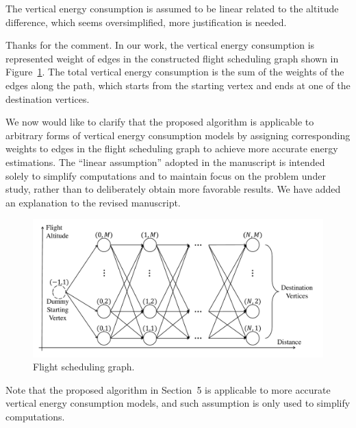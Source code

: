 \begin{revcomment}
	The vertical energy consumption is assumed to be linear related to the altitude difference, which seems oversimplified, more justification is needed.
\end{revcomment}
\begin{revresponse}
	Thanks for the comment.
	In our work, the vertical energy consumption is represented weight of edges in the constructed flight scheduling graph shown in Figure~\ref{fig:fsg}.
	The total vertical energy consumption is the sum of the weights of the edges along the path, which starts from the starting vertex and ends at one of the destination vertices.

	We now would like to clarify that the proposed algorithm is applicable to arbitrary forms of vertical energy consumption models by assigning corresponding weights to edges in the flight scheduling graph to achieve more accurate energy estimations.
	The ``linear assumption'' adopted in the manuscript is intended solely to simplify computations and to maintain focus on the problem under study, rather than to deliberately obtain more favorable results.
	We have added an explanation to the revised manuscript.

	\begin{figure}[h]
		\centerline{\includegraphics[width=.8\textwidth]{fig/FSG_MultiDest.pdf}}
		\caption{Flight scheduling graph.}
		\label{fig:fsg}
	\end{figure}

	\begin{changes}
		Note that the proposed algorithm in Section~5 is applicable to more accurate vertical energy consumption models, and such assumption is only used to simplify computations.
	\end{changes}


\end{revresponse}
